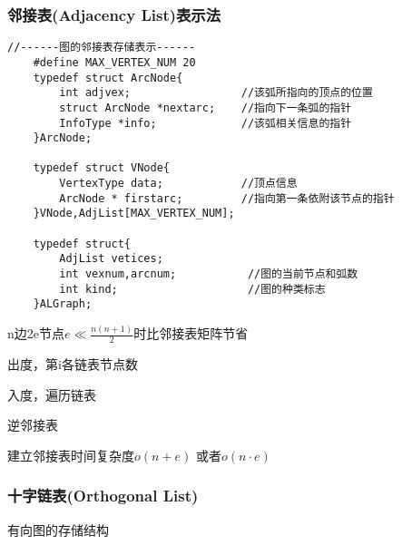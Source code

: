 \documentclass[UTF8]{ctexart}
\begin{document}
\newpage

\subsubsection{邻接表(Adjacency List)表示法}

\begin{lstlisting}[style=v1]
    //------图的邻接表存储表示------
    #define MAX_VERTEX_NUM 20
    typedef struct ArcNode{
        int adjvex;                 //该弧所指向的顶点的位置
        struct ArcNode *nextarc;    //指向下一条弧的指针
        InfoType *info;             //该弧相关信息的指针    
    }ArcNode;

    typedef struct VNode{
        VertexType data;            //顶点信息
        ArcNode * firstarc;         //指向第一条依附该节点的指针    
    }VNode,AdjList[MAX_VERTEX_NUM];

    typedef struct{
        AdjList vetices;
        int vexnum,arcnum;           //图的当前节点和弧数   
        int kind;                    //图的种类标志   
    }ALGraph;
\end{lstlisting}


n边2e节点$e \ll \frac{n(n+1)}{2} $时比邻接表矩阵节省

出度，第i各链表节点数

入度，遍历链表

逆邻接表

建立邻接表时间复杂度$o(n+e)$ 或者$o(n\cdot e)$


\subsubsection{十字链表(Orthogonal List)}

有向图的存储结构
\end{document}
